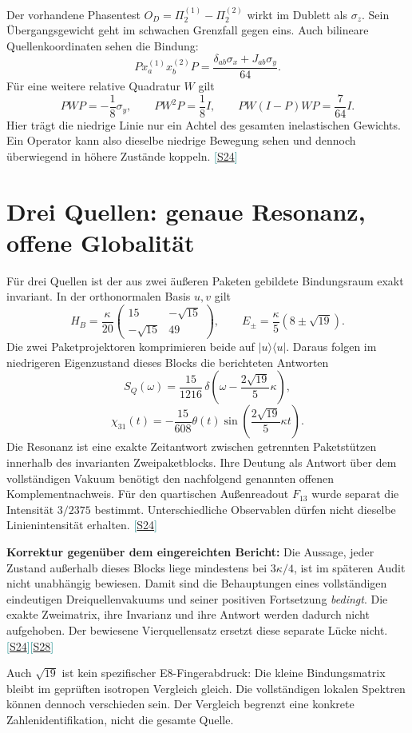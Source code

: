 \documentclass[11pt,a4paper,oneside,parskip=half,headings=normal,numbers=noenddot,bibliography=totoc]{scrreprt}
\newcommand{\ket}[1]{\lvert #1\rangle}
\newcommand{\bra}[1]{\langle #1\rvert}
\newcommand{\src}[1]{\textcolor{teal}{\small[\hyperref[s:#1]{S#1}]}}
\begin{document}
Der vorhandene Phasentest $O_D=\Pi_2^{(1)}-\Pi_2^{(2)}$ wirkt im Dublett als $\sigma_z$. Sein Übergangsgewicht geht im schwachen Grenzfall gegen eins. Auch bilineare Quellenkoordinaten sehen die Bindung:
\[
 P x_a^{(1)}x_b^{(2)}P
 =\frac{\delta_{ab}\sigma_x+J_{ab}\sigma_y}{64}.
\]
Für eine weitere relative Quadratur $W$ gilt
\[
 PWP=-\frac18\sigma_y,\qquad PW^2P=\frac18I,\qquad
 PW(I-P)WP=\frac7{64}I.
\]
Hier trägt die niedrige Linie nur ein Achtel des gesamten inelastischen Gewichts. Ein Operator kann also dieselbe niedrige Bewegung sehen und dennoch überwiegend in höhere Zustände koppeln. \src{24}

\section{Drei Quellen: genaue Resonanz, offene Globalität}
Für drei Quellen ist der aus zwei äußeren Paketen gebildete Bindungsraum exakt invariant. In der orthonormalen Basis $u,v$ gilt
\[
 H_B=\frac\kappa{20}\begin{pmatrix}15&-\sqrt{15}\\-\sqrt{15}&49\end{pmatrix},
 \qquad E_\pm=\frac\kappa5(8\pm\sqrt{19}).
\]
Die zwei Paketprojektoren komprimieren beide auf $\ket u\bra u$. Daraus folgen im niedrigeren Eigenzustand dieses Blocks die berichteten Antworten
\[
 S_Q(\omega)=\frac{15}{1216}\,
 \delta\!\left(\omega-\frac{2\sqrt{19}}5\kappa\right),
\]
\[
 \chi_{31}(t)=-\frac{15}{608}\theta(t)
 \sin\!\left(\frac{2\sqrt{19}}5\kappa t\right).
\]
Die Resonanz ist eine exakte Zeitantwort zwischen getrennten Paketstützen innerhalb des invarianten Zweipaketblocks. Ihre Deutung als Antwort über dem vollständigen Vakuum benötigt den nachfolgend genannten offenen Komplementnachweis. Für den quartischen Außenreadout $F_{13}$ wurde separat die Intensität $3/2375$ bestimmt. Unterschiedliche Observablen dürfen nicht dieselbe Linienintensität erhalten. \src{24}

\textbf{Korrektur gegenüber dem eingereichten Bericht:} Die Aussage, jeder Zustand außerhalb dieses Blocks liege mindestens bei $3\kappa/4$, ist im späteren Audit nicht unabhängig bewiesen. Damit sind die Behauptungen eines vollständigen eindeutigen Dreiquellenvakuums und seiner positiven Fortsetzung \emph{bedingt}. Die exakte Zweimatrix, ihre Invarianz und ihre Antwort werden dadurch nicht aufgehoben. Der bewiesene Vierquellensatz ersetzt diese separate Lücke nicht. \src{24}\src{28}

Auch $\sqrt{19}$ ist kein spezifischer E8-Fingerabdruck: Die kleine Bindungsmatrix bleibt im geprüften isotropen Vergleich gleich. Die vollständigen lokalen Spektren können dennoch verschieden sein. Der Vergleich begrenzt eine konkrete Zahlenidentifikation, nicht die gesamte Quelle.
\end{document}
